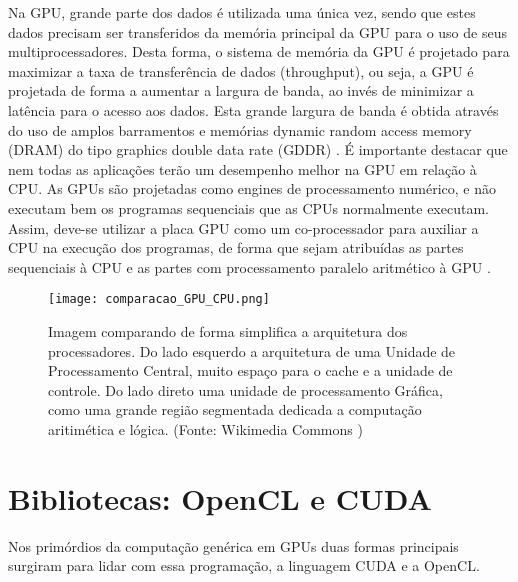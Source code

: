   Na GPU, grande parte dos dados é utilizada uma única vez, sendo que estes dados precisam ser transferidos da memória principal da GPU para o uso de seus multiprocessadores. Desta forma, o sistema de memória da GPU é projetado para maximizar a taxa de transferência de dados (throughput), ou seja, a GPU é projetada de forma a aumentar a largura de banda, ao invés de minimizar a latência para o acesso aos dados. Esta grande largura de banda é obtida através do uso de amplos barramentos e memórias dynamic random access memory (DRAM) do tipo graphics double data rate (GDDR) \citep{closer-look:08}. É importante destacar que nem todas as aplicações terão um desempenho melhor na GPU em relação à CPU. As GPUs são projetadas como engines de processamento numérico, e não executam bem os programas sequenciais que as CPUs normalmente executam. Assim, deve-se utilizar a placa GPU como um co-processador para auxiliar a CPU na execução dos programas, de forma que sejam atribuídas as partes sequenciais à CPU e as partes com processamento paralelo aritmético à GPU \citep{massively:16}.

  \begin{figure}[!h]
    \centering
    \texttt{[image: comparacao\_GPU\_CPU.png]}
    \caption{Imagem comparando de forma simplifica a arquitetura dos processadores. Do lado esquerdo a arquitetura de uma Unidade de Processamento Central, muito espaço para o cache e a unidade de controle. Do lado direto uma unidade de processamento Gráfica, como uma grande região segmentada dedicada a computação aritimética e lógica. (Fonte: Wikimedia Commons \protect\footnotemark)}
    \label{fig:cpuvsgpu}
  \end{figure}


\section{Bibliotecas: OpenCL e CUDA}

  Nos primórdios da computação genérica em GPUs duas formas principais surgiram para lidar com essa programação, a linguagem CUDA e a OpenCL.

